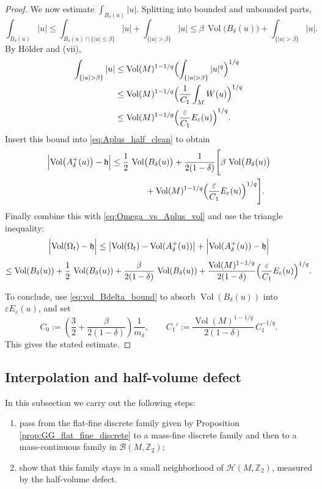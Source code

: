 \documentclass[12pt,english]{article}
\theoremstyle{definition}
\begin{document}
\begin{proof}
\smallskip
We now estimate $\int_{B_\delta(u)}|u|$. Splitting into bounded and unbounded parts,
\[
\int_{B_\delta(u)}|u|
\le \int_{B_\delta(u)\cap\{|u|\le \beta\}}|u|+\int_{\{|u|>\beta\}}|u|
\le \beta\,\operatorname{Vol}\bigl(B_\delta(u)\bigr)+\int_{\{|u|>\beta\}}|u|.
\]
By H\"older and {\rm (vii)},
\begin{align*}
\int_{\{|u|>\beta\}} |u|
&\le \operatorname{Vol}(M)^{1-1/q}\Bigl(\int_{\{|u|>\beta\}} |u|^q\Bigr)^{1/q}\\
&\le \operatorname{Vol}(M)^{1-1/q}\Bigl(\frac{1}{C_1}\int_M W(u)\Bigr)^{1/q}\\
&\le \operatorname{Vol}(M)^{1-1/q}\Bigl(\frac{\varepsilon}{C_1}E_\varepsilon(u)\Bigr)^{1/q}.
\end{align*}
Insert this bound into \eqref{eq:Aplus_half_clean} to obtain
\[
\begin{aligned}
\Bigl|\operatorname{Vol}\bigl(A^+_\delta(u)\bigr)-\mathfrak h\Bigr|
&\le \frac12\,\operatorname{Vol}\bigl(B_\delta(u)\bigr)
+\frac{1}{2(1-\delta)}
\Biggl[
\beta\,\operatorname{Vol}\bigl(B_\delta(u)\bigr)\\
&\qquad\qquad
+ \operatorname{Vol}(M)^{1-1/q}\Bigl(\frac{\varepsilon}{C_1}E_\varepsilon(u)\Bigr)^{1/q}
\Biggr].
\end{aligned}
\]
Finally combine this with \eqref{eq:Omega_vs_Aplus_vol} and use the triangle inequality:
\[
\Bigl|\operatorname{Vol}(\Omega_t)-\mathfrak h\Bigr|
\le \bigl|\operatorname{Vol}(\Omega_t)-\operatorname{Vol}(A^+_\delta(u))\bigr|
     +\Bigl|\operatorname{Vol}(A^+_\delta(u))-\mathfrak h\Bigr|
\]
\[
\le \operatorname{Vol}(B_\delta(u))
+\frac12\,\operatorname{Vol}(B_\delta(u))
+\frac{\beta}{2(1-\delta)}\,\operatorname{Vol}(B_\delta(u))
+\frac{\operatorname{Vol}(M)^{1-1/q}}{2(1-\delta)}\Bigl(\frac{\varepsilon}{C_1}E_\varepsilon(u)\Bigr)^{1/q}.
\]

\smallskip
To conclude, use \eqref{eq:vol_Bdelta_bound} to absorb $\operatorname{Vol}(B_\delta(u))$ into $\varepsilon E_\varepsilon(u)$, and set
\[
C_0:=\left(\frac32+\frac{\beta}{2(1-\delta)}\right)\frac{1}{m_\delta},
\qquad
C_1':=\frac{\operatorname{Vol}(M)^{1-1/q}}{2(1-\delta)}\,C_1^{-1/q}.
\]
This gives the stated estimate.
\end{proof}

\subsection{Interpolation and half-volume defect}

In this subsection we carry out the following steps:
\begin{enumerate}
\item[(i)] pass from the flat-fine discrete family given by Proposition \ref{prop:GG_flat_fine_discrete} to a mass-fine discrete family and then to a mass-continuous family in $\mathcal B(M,\mathbb{Z}_2)$;
\item[(ii)] show that this family stays in a small neighborhood of $\mathcal H(M,\mathbb{Z}_2)$, measured by the half-volume defect.
\end{enumerate}
\end{document}
